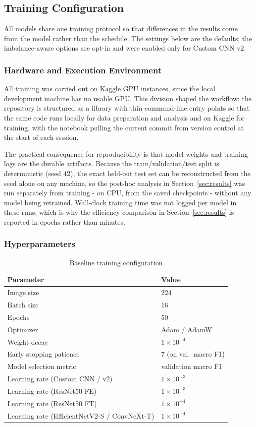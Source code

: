 \documentclass[12pt,a4paper]{article}
\begin{document}
\subsection{Training Configuration}
All models share one training protocol so that differences in the results come from the model rather than the schedule. The settings below are the defaults; the imbalance-aware options are opt-in and were enabled only for Custom CNN v2.
\subsubsection{Hardware and Execution Environment}
All training was carried out on Kaggle GPU instances, since the local development machine has no usable GPU. This division shaped the workflow: the repository is structured as a library with thin command-line entry points so that the same code runs locally for data preparation and analysis and on Kaggle for training, with the notebook pulling the current commit from version control at the start of each session.

The practical consequence for reproducibility is that model weights and training logs are the durable artifacts. Because the train/validation/test split is deterministic (seed 42), the exact held-out test set can be reconstructed from the seed alone on any machine, so the post-hoc analysis in Section~\ref{sec:results} was run separately from training - on CPU, from the saved checkpoints - without any model being retrained. Wall-clock training time was not logged per model in these runs, which is why the efficiency comparison in Section~\ref{sec:results} is reported in epochs rather than minutes.

\subsubsection{Hyperparameters}
\begin{table}[H]
    \centering
    \caption{Baseline training configuration}
    \begin{tabular}{ll}
        \toprule
        Parameter & Value \\
        \midrule
        Image size & 224 \\
        Batch size & 16 \\
        Epochs & 50 \\
        Optimizer & Adam / AdamW \\
        Weight decay & $1 \times 10^{-4}$ \\
        Early stopping patience & 7 (on val.\ macro F1) \\
        Model selection metric & validation macro F1 \\
        Learning rate (Custom CNN / v2) & $1 \times 10^{-3}$ \\
        Learning rate (ResNet50 FE) & $1 \times 10^{-3}$ \\
        Learning rate (ResNet50 FT) & $1 \times 10^{-4}$ \\
        Learning rate (EfficientNetV2-S / ConvNeXt-T) & $1 \times 10^{-4}$ \\
        \bottomrule
    \end{tabular}
\end{table}
\end{document}
